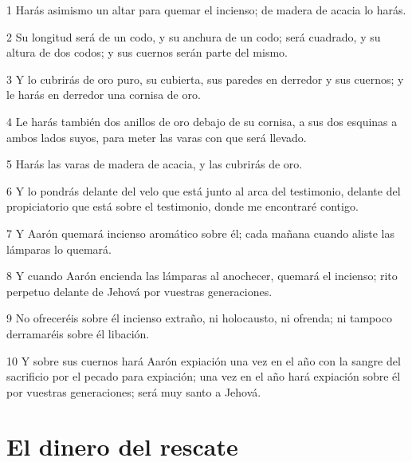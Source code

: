 \par 1 Harás asimismo un altar para quemar el incienso; de madera de acacia lo harás.
\par 2 Su longitud será de un codo,  y su anchura de un codo; será cuadrado, y su altura de dos codos; y sus cuernos serán parte del mismo.
\par 3 Y lo cubrirás de oro puro, su cubierta, sus paredes en derredor y sus cuernos; y le harás en derredor una cornisa de oro.
\par 4 Le harás también dos anillos de oro debajo de su cornisa, a sus dos esquinas a ambos lados suyos, para meter las varas con que será llevado.
\par 5 Harás las varas de madera de acacia, y las cubrirás de oro.
\par 6 Y lo pondrás delante del velo que está junto al arca del testimonio, delante del propiciatorio que está sobre el testimonio, donde me encontraré contigo.
\par 7 Y Aarón quemará incienso aromático sobre él; cada mañana cuando aliste las lámparas lo quemará.
\par 8 Y cuando Aarón encienda las lámparas al anochecer, quemará el incienso; rito perpetuo delante de Jehová por vuestras generaciones.
\par 9 No ofreceréis sobre él incienso extraño, ni holocausto, ni ofrenda; ni tampoco derramaréis sobre él libación.
\par 10 Y sobre sus cuernos hará Aarón expiación una vez en el año con la sangre del sacrificio por el pecado para expiación; una vez en el año hará expiación sobre él por vuestras generaciones; será muy santo a Jehová.

\section*{El dinero del rescate}

